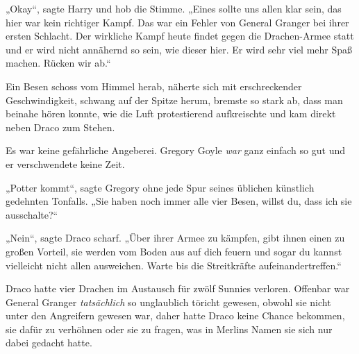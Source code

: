 „Okay“, sagte Harry und hob die Stimme.
„Eines sollte uns allen klar sein, das hier war kein richtiger Kampf. Das war ein Fehler von General Granger bei ihrer ersten Schlacht. Der wirkliche Kampf heute findet gegen die Drachen-Armee statt und er wird nicht annähernd so sein, wie dieser hier. Er wird sehr viel mehr Spaß machen. Rücken wir ab.“

\later

Ein Besen schoss vom Himmel herab, näherte sich mit erschreckender Geschwindigkeit, schwang auf der Spitze herum, bremste so stark ab, dass man beinahe hören konnte, wie die Luft protestierend aufkreischte und kam direkt neben Draco zum Stehen.

Es war keine gefährliche Angeberei. Gregory Goyle \emph{war} ganz einfach so gut und er verschwendete keine Zeit.

„Potter kommt“, sagte Gregory ohne jede Spur seines üblichen künstlich gedehnten Tonfalls.
„Sie haben noch immer alle vier Besen, willst du, dass ich sie ausschalte?“

„Nein“, sagte Draco scharf. „Über ihrer Armee zu kämpfen, gibt ihnen einen zu großen Vorteil, sie werden vom Boden aus auf dich feuern und sogar du kannst vielleicht nicht allen ausweichen. Warte bis die Streitkräfte aufeinandertreffen.“

Draco hatte vier Drachen im Austausch für zwölf Sunnies verloren. Offenbar war General Granger \emph{tatsächlich} so unglaublich töricht gewesen, obwohl sie nicht unter den Angreifern gewesen war, daher hatte Draco keine Chance bekommen, sie dafür zu verhöhnen oder sie zu fragen, was in Merlins Namen sie sich nur dabei gedacht hatte.

